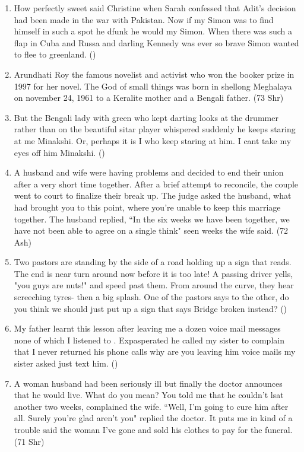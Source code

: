 \documentclass[12pt]{article}
\begin{document}
\begin{enumerate}
      \item How perfectly sweet said Christine when Sarah confessed that Adit's decision had been made in the war with Pakistan. Now if my Simon was to find himself in such a spot he dfunk he would my Simon. When there was such a flap in Cuba and Russa and darling Kennedy was ever so brave Simon wanted to flee to greenland. \hfill ()

      \item Arundhati Roy the famous novelist and activist who won the booker prize in 1997 for her novel. The God of small things was born in shellong Meghalaya on november 24, 1961 to a Keralite mother and a Bengali father. \hfill (73 Shr)

      \item But the Bengali lady with green who kept darting looks at the drummer rather than on the beautiful sitar player whispered suddenly he keeps staring at me Minakshi. Or, perhaps it is I who keep staring at him. I cant take my eyes off him Minakshi. \hfill ()

      \item A husband and wife were having problems and decided to end their union after a very short time together. After a brief attempt to reconcile, the couple went to court to finalize their break up.
        The judge asked the husband, what had brought you to this point, where you're unable to keep this marriage together.
          The husband replied, ``In the six weeks we have been together, we have not been able to agree on a single think"
            seen weeks the wife said. \hfill (72 Ash)

      \item Two pastors are standing by the side of a road holding up a sign that reads. The end is near turn around now before it is too late! A passing driver yells, "you guys are nuts!" and speed past them. From around the curve, they hear screeching tyres- then a big splash. One of the pastors says to the other, do you think we should just put up a sign that says Bridge broken instead? \hfill ()

      \item My father learnt this lesson after leaving me a dozen voice mail messages none of which I listened to . Expasperated he called my sister to complain that I never returned his phone calls why are you leaving him voice mails my sister asked just text him. \hfill ()

      \item A woman husband had been seriously ill but finally the doctor announces that he would live. What do you mean? You told me that he couldn't lsat another two weeks, complained the wife. ``Well, I'm going to cure him after all. Surely you're glad aren't you" replied the doctor. It puts me in kind of a trouble said the woman I've gone and sold his clothes to pay for the funeral. \hfill (71 Shr)


\end{enumerate}
\end{document}
